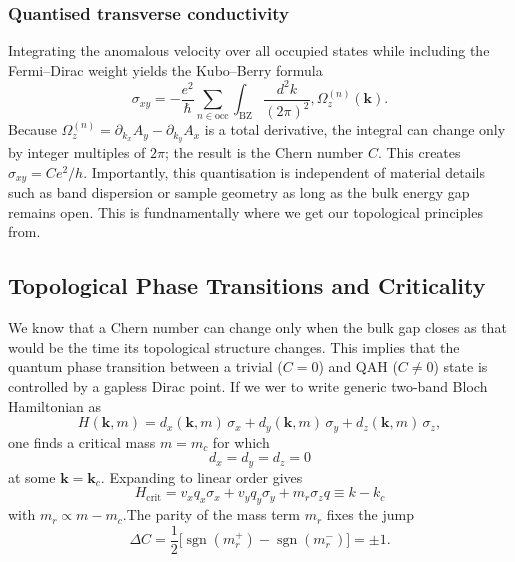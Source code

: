 \documentclass[aps,prb,twocolumn]{revtex4-2}
\begin{document}
      \subsubsection{Quantised transverse conductivity}
      Integrating the anomalous velocity over all occupied states while including the Fermi--Dirac weight yields the Kubo--Berry formula
      \begin{equation}
      \sigma_{xy} = -\frac{e^{2}}{\hbar} \sum_{n\in\text{occ}} \int_{\text{BZ}} \frac{d^{2}k}{(2\pi)^{2}}, \Omega^{(n)}_{z}(\mathbf k).
      \end{equation}
      Because $\Omega^{(n)}_{z}=\partial_{k_{x}}A_{y}-\partial_{k_{y}}A_{x}$ is a
      total derivative, the integral can change only by integer multiples of
      $2\pi$; the result is the Chern number $C$. This creates $\sigma_{xy}=C e^{2}/h$. Importantly, this quantisation is independent of material details such as band dispersion or sample geometry as long as the bulk energy gap remains open. This is fundnamentally where we get our topological principles from.

      \subsection{Topological Phase Transitions and Criticality}
      We know that a Chern number can change only when the bulk gap closes as that would be the time its topological structure changes. This implies that the quantum phase transition between a trivial ($C=0$) and QAH ($C\!\neq\!0$) state is controlled by a gapless Dirac point. If we wer to write generic two-band Bloch Hamiltonian as
      \[ H(\mathbf k,m)=d_x(\mathbf k,m)\,\sigma_x +d_y(\mathbf k,m)\,\sigma_y +d_z(\mathbf k,m)\,\sigma_z, \]
      one finds a critical mass $m=m_c$ for which
      \[d_x=d_y=d_z=0\]
      at some $\mathbf k=\mathbf k_c$.  Expanding to linear order gives 
      \begin{equation}
        H_{\text{crit}}=v_x q_x\sigma_x+v_y q_y\sigma_y +m_r\sigma_z
        q\equiv k-k_c
      \end{equation}
      with $m_r\propto m-m_c$.The parity of the mass term $m_r$ fixes the jump 
      \[ \Delta C=\frac12\bigl[\operatorname{sgn}(m_r^{+})- \operatorname{sgn}(m_r^{-})\bigr]=\pm1. \]
\end{document}
